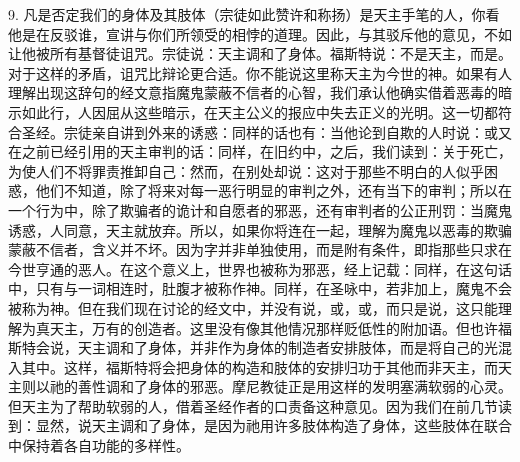 9. 凡是否定我们的身体及其肢体（宗徒如此赞许和称扬）是天主手笔的人，你看他是在反驳谁，宣讲与你们所领受的相悖的道理。因此，与其驳斥他的意见，不如让他被所有基督徒诅咒。宗徒说：天主调和了身体。福斯特说：不是天主，而是。对于这样的矛盾，诅咒比辩论更合适。你不能说这里称天主为今世的神。如果有人理解出现这辞句的经文意指魔鬼蒙蔽不信者的心智，我们承认他确实借着恶毒的暗示如此行，人因屈从这些暗示，在天主公义的报应中失去正义的光明。这一切都符合圣经。宗徒亲自讲到外来的诱惑：同样的话也有：当他论到自欺的人时说：或又在之前已经引用的天主审判的话：同样，在旧约中，之后，我们读到：关于死亡，为使人们不将罪责推卸自己：然而，在别处却说：这对于那些不明白的人似乎困惑，他们不知道，除了将来对每一恶行明显的审判之外，还有当下的审判；所以在一个行为中，除了欺骗者的诡计和自愿者的邪恶，还有审判者的公正刑罚：当魔鬼诱惑，人同意，天主就放弃。所以，如果你将连在一起，理解为魔鬼以恶毒的欺骗蒙蔽不信者，含义并不坏。因为字并非单独使用，而是附有条件，即指那些只求在今世亨通的恶人。在这个意义上，世界也被称为邪恶，经上记载：同样，在这句话中，只有与一词相连时，肚腹才被称作神。同样，在圣咏中，若非加上，魔鬼不会被称为神。但在我们现在讨论的经文中，并没有说，或，或，而只是说，这只能理解为真天主，万有的创造者。这里没有像其他情况那样贬低性的附加语。但也许福斯特会说，天主调和了身体，并非作为身体的制造者安排肢体，而是将自己的光混入其中。这样，福斯特将会把身体的构造和肢体的安排归功于其他而非天主，而天主则以祂的善性调和了身体的邪恶。摩尼教徒正是用这样的发明塞满软弱的心灵。但天主为了帮助软弱的人，借着圣经作者的口责备这种意见。因为我们在前几节读到：显然，说天主调和了身体，是因为祂用许多肢体构造了身体，这些肢体在联合中保持着各自功能的多样性。\par

